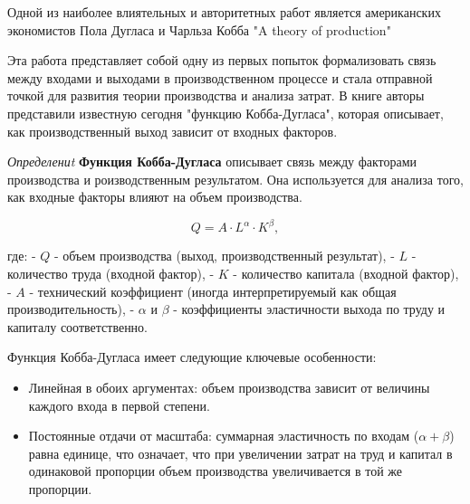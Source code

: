 Одной из наиболее влиятельных и авторитетных работ является американских экономистов Пола Дугласа и Чарльза Кобба  
"A theory of production" \cite{cobb1928theory}

Эта работа представляет собой одну из первых попыток формализовать связь между входами и выходами в производственном процессе и стала отправной точкой для развития теории производства и анализа затрат. В книге авторы представили известную сегодня "функцию Кобба-Дугласа", которая описывает, как производственный выход зависит от входных факторов.

\textit{Определениt} \textbf{Функция Кобба-Дугласа}  описывает связь между факторами производства и роизводственным результатом. Она используется для анализа того, как входные факторы влияют на объем производства.

\[ Q = A \cdot L^\alpha \cdot K^\beta, \]

где:
- \( Q \) - объем производства (выход, производственный результат),
- \( L \) - количество труда (входной фактор),
- \( K \) - количество капитала (входной фактор),
- \( A \) - технический коэффициент (иногда интерпретируемый как общая производительность),
- \( \alpha \) и \( \beta \) - коэффициенты эластичности выхода по труду и капиталу соответственно.

Функция Кобба-Дугласа имеет следующие ключевые особенности:
\begin{itemize}
    \item Линейная в обоих аргументах: объем производства зависит от величины каждого входа в первой степени.
    \item Постоянные отдачи от масштаба: суммарная эластичность по входам (\( \alpha + \beta \)) равна единице, что означает, что при увеличении затрат на труд и капитал в одинаковой пропорции объем производства увеличивается в той же пропорции.
\end{itemize}
